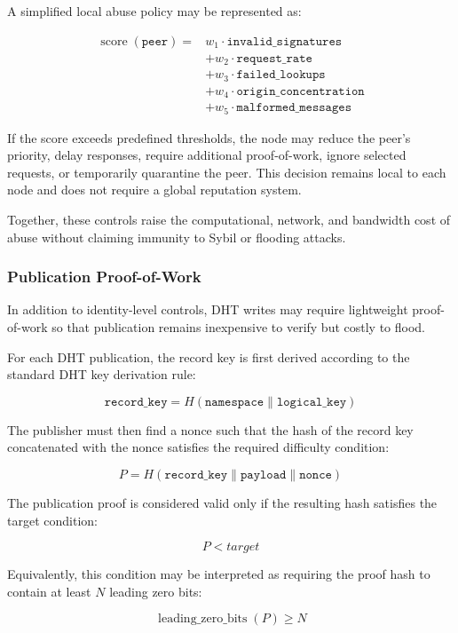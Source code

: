 \documentclass[12pt]{article}
\begin{document}
A simplified local abuse policy may be represented as:

\[
\begin{aligned}
\operatorname{score}(\texttt{peer}) ={}&
w_1 \cdot \texttt{invalid\_signatures} \\
&+ w_2 \cdot \texttt{request\_rate} \\
&+ w_3 \cdot \texttt{failed\_lookups} \\
&+ w_4 \cdot \texttt{origin\_concentration} \\
&+ w_5 \cdot \texttt{malformed\_messages}
\end{aligned}
\]

If the score exceeds predefined thresholds, the node may reduce the peer's priority,
delay responses, require additional proof-of-work, ignore selected requests, or
temporarily quarantine the peer. This decision remains local to each node and does
not require a global reputation system.

Together, these controls raise the computational, network, and bandwidth cost of
abuse without claiming immunity to Sybil or flooding attacks.

\subsubsection{Publication Proof-of-Work}

In addition to identity-level controls, DHT writes may require lightweight
proof-of-work so that publication remains inexpensive to verify but costly to flood.

For each DHT publication, the record key is first derived according to the standard
DHT key derivation rule:

\[
\texttt{record\_key} = H(\texttt{namespace} \parallel \texttt{logical\_key})
\]

The publisher must then find a nonce such that the hash of the record key
concatenated with the nonce satisfies the required difficulty condition:

\[
P = H(\texttt{record\_key} \parallel \texttt{payload} \parallel \texttt{nonce})
\]

The publication proof is considered valid only if the resulting hash satisfies the
target condition:

\[
P < target
\]

Equivalently, this condition may be interpreted as requiring the proof hash to
contain at least \(N\) leading zero bits:

\[
\operatorname{leading\_zero\_bits}(P) \geq N
\]
\end{document}
